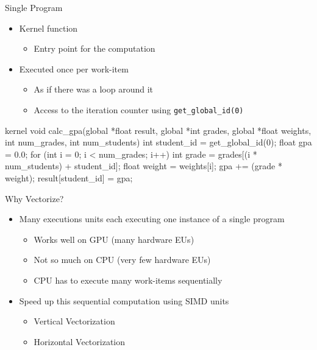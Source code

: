 \begin{frame}[fragile]{Single Program}

\begin{itemize}
    \item Kernel function
    \begin{itemize}
        \item Entry point for the computation
    \end{itemize}
    \item Executed once per work-item
    \begin{itemize}
        \item As if there was a loop around it
        \item Access to the iteration counter using \texttt{get\_global\_id(0)}
    \end{itemize}
\end{itemize}

\begin{codebox}
kernel void calc_gpa(global *float result, global *int grades, global *float weights,
                     int num_grades, int num_students) {
    int student_id = get_global_id(0);
    float gpa = 0.0;
    for (int i = 0; i < num_grades; i++) {
        int grade = grades[(i * num_students) + student_id];
        float weight = weights[i];
        gpa += (grade * weight);
    }
    result[student_id] = gpa;
}
\end{codebox}

\end{frame}


\begin{frame}{Why Vectorize?}

\begin{itemize}
    \item Many executions units each executing one instance of a single program 
    \begin{itemize}
        \item Works well on GPU (many hardware EUs)
        \item Not so much on CPU (very few hardware EUs)
        \item CPU has to execute many work-items sequentially
    \end{itemize}
    \item Speed up this sequential computation using SIMD units
    \begin{itemize}
        \item Vertical Vectorization
        \item Horizontal Vectorization
    \end{itemize}
\end{itemize}

\end{frame}

